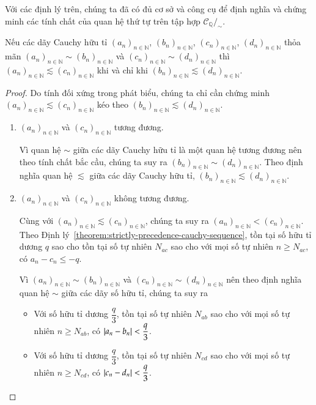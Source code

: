Với các định lý trên, chúng ta đã có đủ cơ sở và công cụ để định nghĩa và chứng minh các tính chất của quan hệ thứ tự trên tập hợp $\mathscr{C}_{\mathbb{Q}}/_{\sim}$.

\begin{theorem}\label{theorem:equivalent-cauchy-sequences-and-preorder}
    Nếu các dãy Cauchy hữu tỉ ${(a_{n})}_{n\in\mathbb{N}}$, ${(b_{n})}_{n\in\mathbb{N}}$, ${(c_{n})}_{n\in\mathbb{N}}$, ${(d_{n})}_{n\in\mathbb{N}}$ thỏa mãn ${(a_{n})}_{n\in\mathbb{N}}\sim {(b_{n})}_{n\in\mathbb{N}}$ và ${(c_{n})}_{n\in\mathbb{N}}\sim {(d_{n})}_{n\in\mathbb{N}}$ thì ${(a_{n})}_{n\in\mathbb{N}}\lesssim {(c_{n})}_{n\in\mathbb{N}}$ khi và chỉ khi ${(b_{n})}_{n\in\mathbb{N}}\lesssim {(d_{n})}_{n\in\mathbb{N}}$.
\end{theorem}

\begin{proof}
    Do tính đối xứng trong phát biểu, chúng ta chỉ cần chứng minh ${(a_{n})}_{n\in\mathbb{N}}\lesssim {(c_{n})}_{n\in\mathbb{N}}$ kéo theo ${(b_{n})}_{n\in\mathbb{N}}\lesssim {(d_{n})}_{n\in\mathbb{N}}$.

    \begin{enumerate}[label={\textbf{Trường hợp \arabic*.}},itemindent=2cm]
        \item ${(a_{n})}_{n\in\mathbb{N}}$ và ${(c_{n})}_{n\in\mathbb{N}}$ tương đương.

              Vì quan hệ $\sim$ giữa các dãy Cauchy hữu tỉ là một quan hệ tương đương nên theo tính chất bắc cầu, chúng ta suy ra ${(b_{n})}_{n\in\mathbb{N}}\sim {(d_{n})}_{n\in\mathbb{N}}$. Theo định nghĩa quan hệ $\lesssim$ giữa các dãy Cauchy hữu tỉ, ${(b_{n})}_{n\in\mathbb{N}}\lesssim {(d_{n})}_{n\in\mathbb{N}}$.

        \item ${(a_{n})}_{n\in\mathbb{N}}$ và ${(c_{n})}_{n\in\mathbb{N}}$ không tương đương.

              Cùng với ${(a_{n})}_{n\in\mathbb{N}}\lesssim {(c_{n})}_{n\in\mathbb{N}}$, chúng ta suy ra ${(a_{n})}_{n\in\mathbb{N}} < {(c_{n})}_{n\in\mathbb{N}}$.  Theo Định lý~\ref{theorem:strictly-precedence-cauchy-sequence}, tồn tại số hữu tỉ dương $q$ sao cho tồn tại số tự nhiên $N_{ac}$ sao cho với mọi số tự nhiên $n\geq N_{ac}$, có $a_{n} - c_{n}\leq -q$.

              Vì ${(a_{n})}_{n\in\mathbb{N}}\sim {(b_{n})}_{n\in\mathbb{N}}$ và ${(c_{n})}_{n\in\mathbb{N}}\sim {(d_{n})}_{n\in\mathbb{N}}$ nên theo định nghĩa quan hệ $\sim$ giữa các dãy số hữu tỉ, chúng ta suy ra
              \begin{itemize}
                  \item Với số hữu tỉ dương $\dfrac{q}{3}$, tồn tại số tự nhiên $N_{ab}$ sao cho với mọi số tự nhiên $n\geq N_{ab}$, có $\left\vert{a_{n} - b_{n}}\right\vert < \dfrac{q}{3}$.
                  \item Với số hữu tỉ dương $\dfrac{q}{3}$, tồn tại số tự nhiên $N_{cd}$ sao cho với mọi số tự nhiên $n\geq N_{cd}$, có $\left\vert{c_{n} - d_{n}}\right\vert < \dfrac{q}{3}$.
              \end{itemize}


\end{enumerate}
\end{proof}
